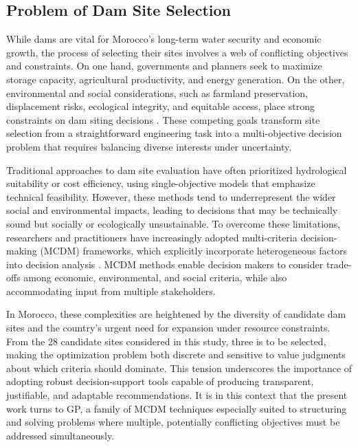 \subsection{Problem of Dam Site Selection}
While dams are vital for Morocco's long-term water security and economic growth, the process of selecting their sites involves a web of conflicting objectives and constraints. On one hand, governments and planners seek to maximize storage capacity, agricultural productivity, and energy generation. On the other, environmental and social considerations, such as farmland preservation, displacement risks, ecological integrity, and equitable access, place strong constraints on dam siting decisions \cite{Wang2021,Zerdeb2025}. These competing goals transform site selection from a straightforward engineering task into a multi-objective decision problem that requires balancing diverse interests under uncertainty.

Traditional approaches to dam site evaluation have often prioritized hydrological suitability or cost efficiency, using single-objective models that emphasize technical feasibility. However, these methods tend to underrepresent the wider social and environmental impacts, leading to decisions that may be technically sound but socially or ecologically unsustainable. To overcome these limitations, researchers and practitioners have increasingly adopted multi-criteria decision-making (MCDM) frameworks, which explicitly incorporate heterogeneous factors into decision analysis \cite{Wang2021,Hagos2022}. MCDM methods enable decision makers to consider trade-offs among economic, environmental, and social criteria, while also accommodating input from multiple stakeholders.

In Morocco, these complexities are heightened by the diversity of candidate dam sites and the country's urgent need for expansion under resource constraints. From the 28 candidate sites considered in this study, three is to be selected, making the optimization problem both discrete and sensitive to value judgments about which criteria should dominate. This tension underscores the importance of adopting robust decision-support tools capable of producing transparent, justifiable, and adaptable recommendations. It is in this context that the present work turns to \gls{GP}, a family of MCDM techniques especially suited to structuring and solving problems where multiple, potentially conflicting objectives must be addressed simultaneously.


